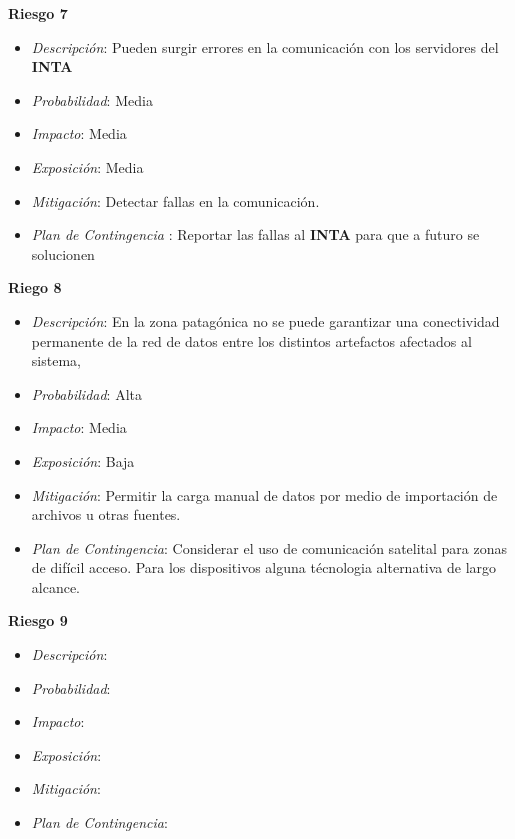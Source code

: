 \textbf{Riesgo 7}
\begin{itemize}
 \item \textsl{Descripci\'on}: Pueden surgir errores en la comunicaci\'on con los servidores del \textbf{INTA}
 \item \textsl{Probabilidad}: Media
 \item \textsl{Impacto}: Media
 \item \textsl{Exposición}: Media
 \item \textsl{Mitigación}: Detectar fallas en la comunicación.
 \item \textsl{Plan de Contingencia} : Reportar las fallas al \textbf{INTA} para que a futuro se solucionen
\end{itemize}

\textbf{Riego 8}
\begin{itemize}
 \item \textsl{Descripci\'on}: En la zona patagónica no se puede garantizar una conectividad permanente de la red de datos entre los distintos artefactos afectados al sistema,
 \item \textsl{Probabilidad}: Alta
 \item \textsl{Impacto}: Media
 \item \textsl{Exposición}: Baja
 \item \textsl{Mitigación}: Permitir la carga manual de datos por medio de importación de archivos u otras fuentes.
 \item \textsl{Plan de Contingencia}: Considerar el uso de comunicaci\'on satelital para zonas de dif\'icil acceso. Para los dispositivos alguna t\'ecnologia alternativa de largo alcance.
\end{itemize}


\textbf{Riesgo 9}
\begin{itemize}
 \item \textsl{Descripci\'on}: 
 \item \textsl{Probabilidad}: 
 \item \textsl{Impacto}: 
 \item \textsl{Exposición}: 
 \item \textsl{Mitigación}: 
 \item \textsl{Plan de Contingencia}: 
\end{itemize}
